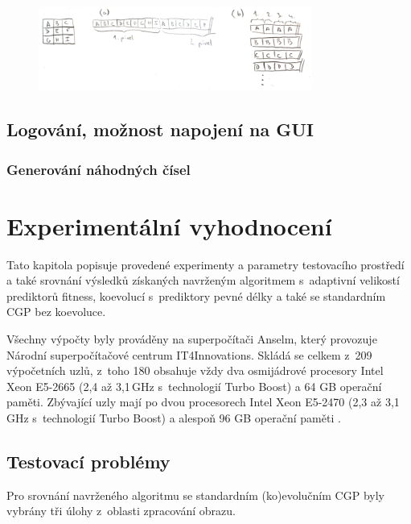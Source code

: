 
\begin{figure}[hb]
    \centering
    \includegraphics[width=0.8\textwidth]{fig/windows}
    \caption{}
    \label{obrDevitiokoli}
\end{figure}


\section{Logování, možnost napojení na GUI}
\label{secImplExperimental}

\subsection{Generování náhodných čísel}

\chapter{Experimentální vyhodnocení}
\label{chExperiments}

Tato kapitola popisuje provedené experimenty a parametry testovacího prostředí a také srovnání výsledků získaných navrženým algoritmem s~adaptivní velikostí prediktorů fitness, koevolucí s~prediktory pevné délky a také se standardním CGP bez koevoluce.

Všechny výpočty byly prováděny na superpočítači Anselm, který provozuje Národní superpočítačové centrum IT4Innovations. Skládá se celkem z~209 výpočetních uzlů, z~toho 180 obsahuje vždy dva osmijádrové procesory Intel Xeon E5-2665 (2,4 až 3,1\,GHz s~technologií Turbo Boost) a 64 GB operační paměti. Zbývající uzly mají po dvou procesorech Intel Xeon E5-2470 (2,3 až 3,1\,GHz s~technologií Turbo Boost) a alespoň 96 GB operační paměti \cite{AnselmSpecs}.

\section{Testovací problémy}

Pro srovnání navrženého algoritmu se standardním (ko)evolučním CGP byly vybrány tři úlohy z~oblasti zpracování obrazu.

